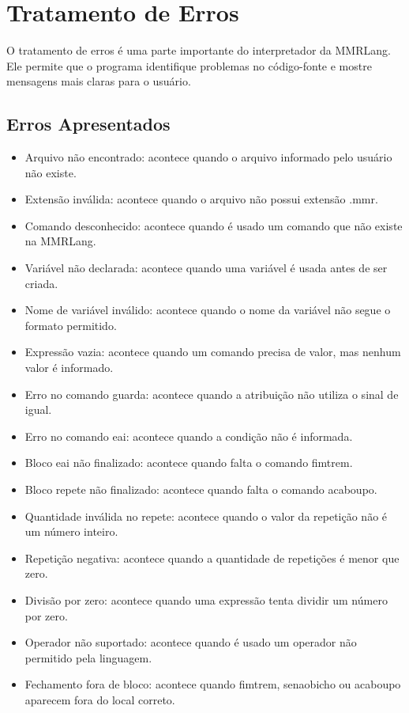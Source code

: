 \documentclass[12pt,a4paper]{article}
\begin{document}
\section{Tratamento de Erros}

O tratamento de erros é uma parte importante do interpretador da MMRLang. Ele permite que o programa identifique problemas no código-fonte e mostre mensagens mais claras para o usuário.

\subsection{Erros Apresentados}

\begin{itemize}
\item Arquivo não encontrado: acontece quando o arquivo informado pelo usuário não existe.
\item Extensão inválida: acontece quando o arquivo não possui extensão .mmr.
\item Comando desconhecido: acontece quando é usado um comando que não existe na MMRLang.
\item Variável não declarada: acontece quando uma variável é usada antes de ser criada.
\item Nome de variável inválido: acontece quando o nome da variável não segue o formato permitido.
\item Expressão vazia: acontece quando um comando precisa de valor, mas nenhum valor é informado.
\item Erro no comando guarda: acontece quando a atribuição não utiliza o sinal de igual.
\item Erro no comando eai: acontece quando a condição não é informada.
\item Bloco eai não finalizado: acontece quando falta o comando fimtrem.
\item Bloco repete não finalizado: acontece quando falta o comando acaboupo.
\item Quantidade inválida no repete: acontece quando o valor da repetição não é um número inteiro.
\item Repetição negativa: acontece quando a quantidade de repetições é menor que zero.
\item Divisão por zero: acontece quando uma expressão tenta dividir um número por zero.
\item Operador não suportado: acontece quando é usado um operador não permitido pela linguagem.
\item Fechamento fora de bloco: acontece quando fimtrem, senaobicho ou acaboupo aparecem fora do local correto.
\end{itemize}
\end{document}
